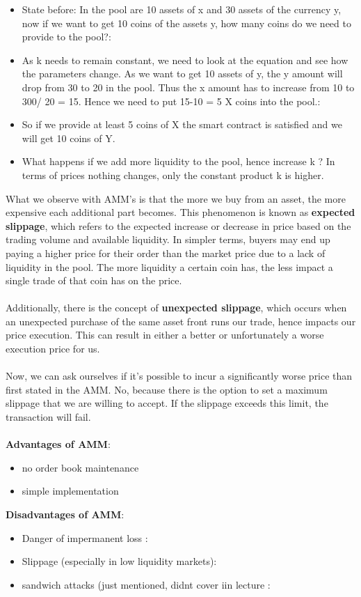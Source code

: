 \documentclass{article}
\begin{document}
\begin{itemize}
    \item {State before: In the pool are 10 assets of x and 30 assets of the currency y, now if we want to get 10 coins of the assets y, how many coins do we need to provide to the pool?}: 
    \item {As k needs to remain constant, we need to look at the equation and see how the parameters change. As we want to get 10 assets of y, the y amount will drop from 30 to 20 in the pool. Thus the x amount has to increase from 10 to 300/ 20 = 15. Hence we need to put 15-10 = 5 X coins into the pool.}:  
    \item {So if we provide at least 5 coins of X the smart contract is satisfied and we will get 10 coins of Y.}
\item {What happens if we add more liquidity to the pool, hence increase k ? In terms of prices nothing changes, only the constant product k is higher.}
\end{itemize}What we observe with AMM's is that the more we buy from an asset, the more expensive each additional part becomes. This phenomenon is known as \textbf{expected slippage}, which refers to the expected increase or decrease in price based on the trading volume and available liquidity. In simpler terms, buyers may end up paying a higher price for their order than the market price due to a lack of liquidity in the pool. The more liquidity a certain coin has, the less impact a single trade of that coin has on the price.\\
\\
Additionally, there is the concept of \textbf{unexpected slippage}, which occurs when an unexpected purchase of the same asset front runs our trade, hence impacts our price execution. This can result in either a better or unfortunately a worse execution price for us.\\
\\
Now, we can ask ourselves if it's possible to incur a significantly worse price than first stated in the AMM. No, because there is the option to set a maximum slippage that we are willing to accept. If the slippage exceeds this limit, the transaction will fail.\\
\\

\textbf{Advantages of AMM}:
\begin{itemize}
    \item {no order book maintenance}
    \item {simple implementation}

\end{itemize}
\textbf{Disadvantages of AMM}:
\begin{itemize}
    \item {Danger of impermanent loss }: 
    \item {Slippage (especially in low liquidity markets)}: 
    \item {sandwich attacks (just mentioned, didnt cover iin lecture }:  
\end{itemize}
\end{document}

